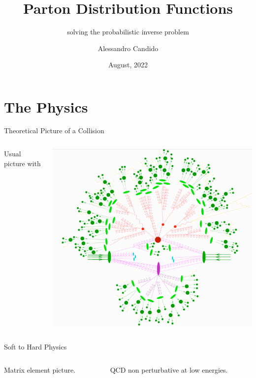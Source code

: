 \documentclass[9pt]{beamer}
\title{Parton Distribution Functions}
\subtitle{solving the probabilistic inverse problem}
\date{August, 2022}
\author{Alessandro Candido}
\begin{document}
\maketitle


\section{The Physics}

\begin{frame}{Theoretical Picture of a Collision}
    \begin{columns}
        \begin{column}{0.5\textwidth}
            Usual picture with 
        \end{column}
        \begin{column}{0.5\textwidth}
            \begin{tcolorbox}[size=tight,sharpish corners,boxrule=0mm]
                \includegraphics[width=\textwidth]{proton-to-detector}
            \end{tcolorbox}
        \end{column}
    \end{columns}
\end{frame}

\begin{frame}{Soft to Hard Physics}
    \begin{columns}
        \begin{column}{0.5\textwidth}
            Matrix element picture.
        \end{column}
        \begin{column}{0.5\textwidth}
            QCD non perturbative at low energies.
        \end{column}
    \end{columns}
\end{frame}
\end{document}
